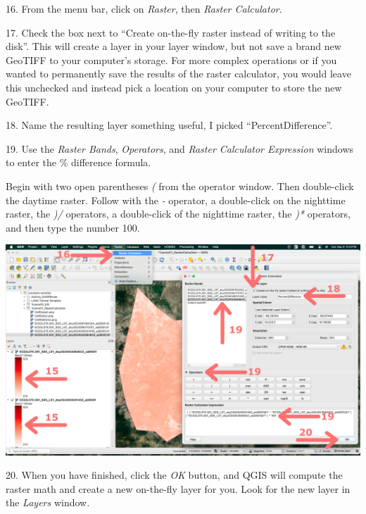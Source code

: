 \documentclass[oneside,a4paper,11pt,explicit]{book}
\begin{document}
16. From the menu bar, click on \textit{Raster}, then \textit{Raster Calculator}.

17. Check the box next to ``Create on-the-fly raster instead of writing to the disk''. This will create a layer in your layer window, but not save a brand new GeoTIFF to your computer's storage. For more complex operations or if you wanted to permanently save the results of the raster calculator, you would leave this unchecked and instead pick a location on your computer to store the new GeoTIFF. 

18. Name the resulting layer something useful, I picked ``PercentDifference''.

19. Use the \textit{Raster Bands}, \textit{Operators}, and \textit{Raster Calculator Expression} windows to enter the \% difference formula.

Begin with two open parentheses \textit{(} from the operator window. Then double-click the daytime raster. Follow with the \textit{-} operator, a double-click on the nighttime raster, the \textit{)/} operators, a double-click of the nighttime raster, the \textit{)*} operators, and then type the number 100.


\vspace{.5em}

\centerline{\includegraphics[width=\textwidth]{RasterCalc.png}}

\vspace{.5em}

20. When you have finished, click the \textit{OK} button, and QGIS will compute the raster math and create a new on-the-fly layer for you. Look for the new layer in the \textit{Layers} window.
\end{document}
